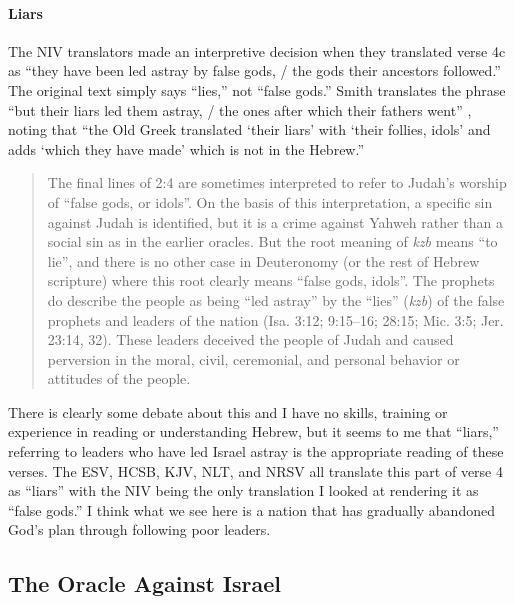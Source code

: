 \paragraph{Liars} The NIV translators made an interpretive decision when they
translated verse 4c as \enquote{they have been led astray by false gods, / the
gods their ancestors followed.} The original text simply says \enquote{lies,}
not \enquote{false gods.} Smith translates the phrase \enquote{but their liars
led them astray, / the ones after which their fathers went}
\autocite[106]{smith:2017}, noting that \enquote{the Old Greek translated
\enquote{their liars} with \enquote{their follies, idols} and adds
\enquote{which they have made} which is not in the Hebrew.}

\begin{quote}
    The final lines of 2:4 are sometimes interpreted to refer to Judah's worship
    of \enquote{false gods, or idols}. On the basis of this interpretation, a
    specific sin against Judah is identified, but it is a crime against Yahweh
    rather than a social sin as in the earlier oracles. But the root meaning of
    \textit{kzb} means \enquote{to lie}, and there is no other case in
    Deuteronomy (or the rest of Hebrew scripture) where this root clearly means
    \enquote{false gods, idols}. The prophets do describe the people as being
    \enquote{led astray} by the \enquote{lies} (\textit{kzb}) of the false
    prophets and leaders of the nation (Isa. 3:12; 9:15--16; 28:15; Mic. 3:5;
    Jer. 23:14, 32). These leaders deceived the people of Judah and caused
    perversion in the moral, civil, ceremonial, and personal behavior or
    attitudes of the people.
    \autocite[115-116]{smith:2017}
\end{quote}

There is clearly some debate about this and I have no skills, training or
experience in reading or understanding Hebrew, but it seems to me that
\enquote{liars,} referring to leaders who have led Israel astray is the
appropriate reading of these verses. The ESV, HCSB, KJV, NLT, and NRSV all
translate this part of verse 4 as \enquote{liars} with the NIV being the only
translation I looked at rendering it as \enquote{false gods.} I think what we
see here is a nation that has gradually abandoned God's plan through following
poor leaders.

\subsection{The Oracle Against Israel}

